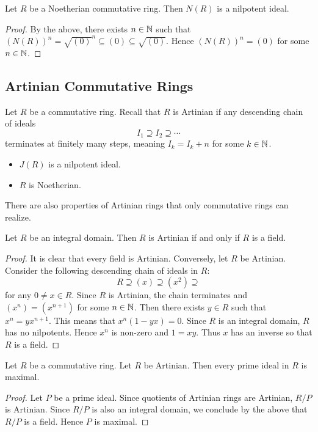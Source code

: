 \documentclass[a4paper]{article}
\begin{document}
\begin{prp}{}{} Let $R$ be a Noetherian commutative ring. Then $N(R)$ is a nilpotent ideal. \tcbline
\begin{proof}
By the above, there exists $n\in\mathbb{N}$ such that $(N(R))^n=\sqrt{(0)}^n\subseteq (0)\subseteq\sqrt{(0)}$. Hence $(N(R))^n=(0)$ for some $n\in\mathbb{N}$. 
\end{proof}
\end{prp}

\subsection{Artinian Commutative Rings}
Let $R$ be a commutative ring. Recall that $R$ is Artinian if any descending chain of ideals $$I_1\supseteq I_2\supseteq\cdots$$ terminates at finitely many steps, meaning $I_k=I_k+n$ for some $k\in\mathbb{N}$. 

\begin{itemize}
\item $J(R)$ is a nilpotent ideal. 
\item $R$ is Noetherian. 
\end{itemize}

There are also properties of Artinian rings that only commutative rings can realize. 

\begin{prp}{}{} Let $R$ be an integral domain. Then $R$ is Artinian if and only if $R$ is a field. \tcbline
\begin{proof}
It is clear that every field is Artinian. Conversely, let $R$ be Artinian. Consider the following descending chain of ideals in $R$: $$R\supseteq(x)\supseteq(x^2)\supseteq$$ for any $0\neq x\in R$. Since $R$ is Artinian, the chain terminates and $(x^n)=(x^{n+1})$ for some $n\in\mathbb{N}$. Then there exists $y\in R$ such that $x^n=yx^{n+1}$. This means that $x^n(1-yx)=0$. Since $R$ is an integral domain, $R$ has no nilpotents. Hence $x^n$ is non-zero and $1=xy$. Thus $x$ has an inverse so that $R$ is a field. 
\end{proof}
\end{prp}

\begin{prp}{}{} Let $R$ be a commutative ring. Let $R$ be Artinian. Then every prime ideal in $R$ is maximal. \tcbline
\begin{proof}
Let $P$ be a prime ideal. Since quotients of Artinian rings are Artinian, $R/P$ is Artinian. Since $R/P$ is also an integral domain, we conclude by the above that $R/P$ is a field. Hence $P$ is maximal. 
\end{proof}
\end{prp}
\end{document}

